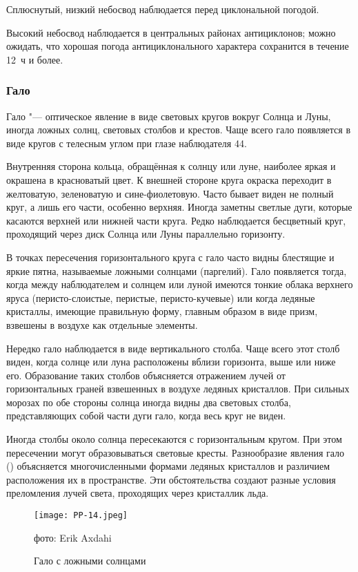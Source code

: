  Сплюснутый, низкий небосвод наблюдается перед циклональной
погодой.

 Высокий небосвод наблюдается в центральных районах
антициклонов; можно ожидать, что хорошая погода антициклонального
характера сохранится в течение 12~ч и более.

\subsubsection{Гало}

Гало "--- оптическое явление в виде световых кругов вокруг Солнца и
Луны, иногда ложных солнц, световых столбов и крестов. Чаще всего гало
появляется в виде кругов с телесным углом при глазе наблюдателя 44\gr.

Внутренняя сторона кольца, обращённая к солнцу или луне, наиболее
яркая и окрашена в красноватый цвет. К внешней стороне круга окраска
переходит в желтоватую, зеленоватую и сине-фиолетовую. Часто бывает
виден не полный круг, а лишь его части, особенно верхняя. Иногда
заметны светлые дуги, которые касаются верхней или нижней части
круга. Редко наблюдается бесцветный круг, проходящий через диск Солнца
или Луны параллельно горизонту.

В точках пересечения горизонтального круга с гало часто видны
блестящие и яркие пятна, называемые ложными солнцами (паргелий). Гало
появляется тогда, когда между наблюдателем и солнцем или луной имеются
тонкие облака верхнего яруса (перисто-слоистые, перистые,
перисто-кучевые) или когда ледяные кристаллы, имеющие правильную
форму, главным образом в виде призм, взвешены в воздухе как отдельные
элементы.

Нередко гало наблюдается в виде вертикального столба. Чаще всего этот
столб виден, когда солнце или луна расположены вблизи горизонта, выше
или ниже его. Образование таких столбов объясняется отражением лучей
от горизонтальных граней взвешенных в воздухе ледяных кристаллов. При
сильных морозах по обе стороны солнца иногда видны два световых
столба, представляющих собой части дуги гало, когда весь круг не
виден.

Иногда столбы около солнца пересекаются с горизонтальным кругом. При
этом пересечении могут образовываться световые кресты. Разнообразие
явления гало () объясняется многочисленными формами ледяных
кристаллов и различием расположения их в пространстве. Эти
обстоятельства создают разные условия преломления лучей света,
проходящих через кристаллик льда.

\begin{figure}[htb]
  \centering{}
  \texttt{[image: PP-14.jpeg]}
  \caption{Гало с ложными солнцами}
  \label{fig:pp14}
  \small
  \centering{}фото: Erik Axdahi
\end{figure}

